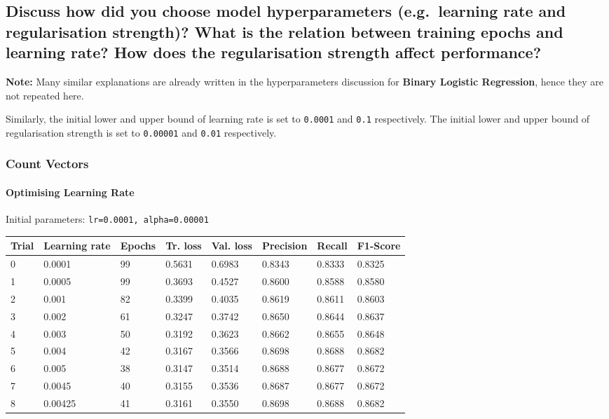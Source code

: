 \documentclass[11pt]{article}
\begin{document}
    \hypertarget{discuss-how-did-you-choose-model-hyperparameters-e.g.-learning-rate-and-regularisation-strength-what-is-the-relation-between-training-epochs-and-learning-rate-how-does-the-regularisation-strength-affect-performance}{%
\subsection{Discuss how did you choose model hyperparameters
(e.g.~learning rate and regularisation strength)? What is the relation
between training epochs and learning rate? How does the regularisation
strength affect
performance?}\label{discuss-how-did-you-choose-model-hyperparameters-e.g.-learning-rate-and-regularisation-strength-what-is-the-relation-between-training-epochs-and-learning-rate-how-does-the-regularisation-strength-affect-performance}}

\textbf{Note:} Many similar explanations are already written in the
hyperparameters discussion for \textbf{Binary Logistic Regression},
hence they are not repeated here.

Similarly, the initial lower and upper bound of learning rate is set to
\texttt{0.0001} and \texttt{0.1} respectively. The initial lower and
upper bound of regularisation strength is set to \texttt{0.00001} and
\texttt{0.01} respectively.

\hypertarget{count-vectors}{%
\subsubsection{Count Vectors}\label{count-vectors}}

\hypertarget{optimising-learning-rate}{%
\paragraph{Optimising Learning Rate}\label{optimising-learning-rate}}

Initial parameters: \texttt{lr=0.0001,\ alpha=0.00001}

\begin{longtable}[]{@{}llllllll@{}}
\toprule
Trial & Learning rate & Epochs & Tr. loss & Val. loss & Precision &
Recall & F1-Score\tabularnewline
\midrule
\endhead
0 & 0.0001 & 99 & 0.5631 & 0.6983 & 0.8343 & 0.8333 &
0.8325\tabularnewline
1 & 0.0005 & 99 & 0.3693 & 0.4527 & 0.8600 & 0.8588 &
0.8580\tabularnewline
2 & 0.001 & 82 & 0.3399 & 0.4035 & 0.8619 & 0.8611 &
0.8603\tabularnewline
3 & 0.002 & 61 & 0.3247 & 0.3742 & 0.8650 & 0.8644 &
0.8637\tabularnewline
4 & 0.003 & 50 & 0.3192 & 0.3623 & 0.8662 & 0.8655 &
0.8648\tabularnewline
5 & 0.004 & 42 & 0.3167 & 0.3566 & 0.8698 & 0.8688 &
0.8682\tabularnewline
6 & 0.005 & 38 & 0.3147 & 0.3514 & 0.8688 & 0.8677 &
0.8672\tabularnewline
7 & 0.0045 & 40 & 0.3155 & 0.3536 & 0.8687 & 0.8677 &
0.8672\tabularnewline
8 & 0.00425 & 41 & 0.3161 & 0.3550 & 0.8698 & 0.8688 &
0.8682\tabularnewline
\bottomrule
\end{longtable}
\end{document}

